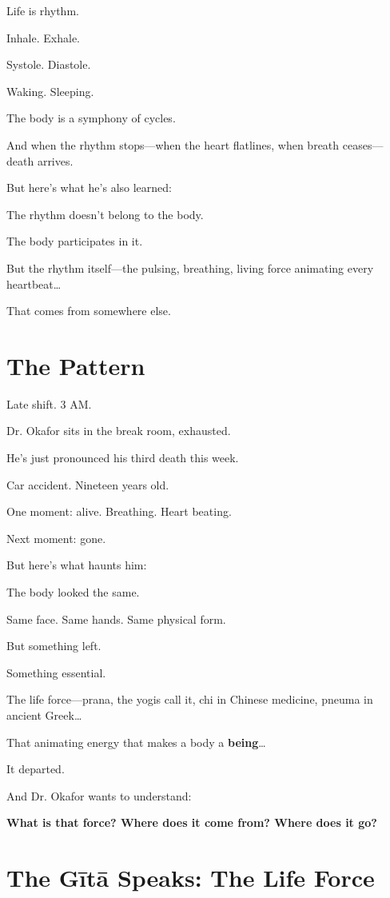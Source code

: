 \documentclass[11pt,twoside]{book}
\begin{document}
Life is rhythm.

Inhale. Exhale.

Systole. Diastole.

Waking. Sleeping.

The body is a symphony of cycles.

And when the rhythm stops—when the heart flatlines, when breath ceases—death arrives.

But here's what he's also learned:

The rhythm doesn't belong to the body.

The body participates in it.

But the rhythm itself—the pulsing, breathing, living force animating every heartbeat\ldots{}

That comes from somewhere else.

\section*{The Pattern}

Late shift. 3 AM.

Dr. Okafor sits in the break room, exhausted.

He's just pronounced his third death this week.

Car accident. Nineteen years old.

One moment: alive. Breathing. Heart beating.

Next moment: gone.

But here's what haunts him:

The body looked the same.

Same face. Same hands. Same physical form.

But something left.

Something essential.

The life force—prana, the yogis call it, chi in Chinese medicine, pneuma in ancient Greek\ldots{}

That animating energy that makes a body a \textbf{being}\ldots{}

It departed.

And Dr. Okafor wants to understand:

\textbf{What is that force? Where does it come from? Where does it go?}

\section*{The Gītā Speaks: The Life Force}
\end{document}
